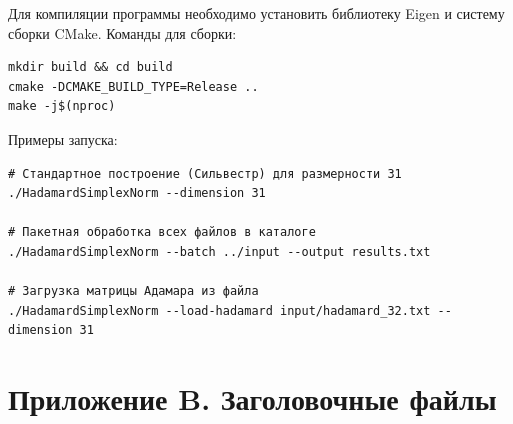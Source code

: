 \documentclass[a4paper,12pt]{article}
\theoremstyle{indented}
\begin{document}
Для компиляции программы необходимо установить библиотеку Eigen и систему сборки CMake. Команды для сборки:

\begin{verbatim}
mkdir build && cd build
cmake -DCMAKE_BUILD_TYPE=Release ..
make -j$(nproc)
\end{verbatim}

Примеры запуска:

\begin{verbatim}
# Стандартное построение (Сильвестр) для размерности 31
./HadamardSimplexNorm --dimension 31

# Пакетная обработка всех файлов в каталоге
./HadamardSimplexNorm --batch ../input --output results.txt

# Загрузка матрицы Адамара из файла
./HadamardSimplexNorm --load-hadamard input/hadamard_32.txt --dimension 31
\end{verbatim}

\newpage

\section*{Приложение B. Заголовочные файлы}
\end{document}
